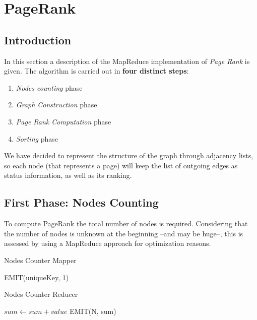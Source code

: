 \section{PageRank}

\subsection{Introduction}
In this section a description of the MapReduce implementation of \textit{Page Rank} is given.
The algorithm is carried out in \textbf{four distinct steps}:
\begin{enumerate}
	\item \textit{Nodes counting} phase
	\item \textit{Graph Construction} phase
	\item \textit{Page Rank Computation} phase
	\item \textit{Sorting} phase
\end{enumerate}


\noindent We have decided to represent the structure of the graph through adjacency lists, so each node (that represents a page) will keep the list of outgoing edges as status information, as well as its ranking.



\subsection{First Phase: Nodes Counting}
To compute PageRank the total number of nodes is required. Considering that the number of nodes is unknown at the beginning –and may be huge–, this is assessed by using a MapReduce approach for optimization reasons.


\begin{algorithm}[H]
	\caption{Nodes Counter Mapper}\label{Mapper}
		\begin{algorithmic}[1]
						\State EMIT(uniqueKey, 1) 
					\EndIf
			\EndProcedure
	\end{algorithmic}
\end{algorithm}


\begin{algorithm}[H]
	\caption{Nodes Counter Reducer}\label{Reducer}
		\begin{algorithmic}[1]
						\State $sum \gets sum + value$
					\EndFor
					\State EMIT(N, sum)
			\EndProcedure
	\end{algorithmic}
\end{algorithm}


